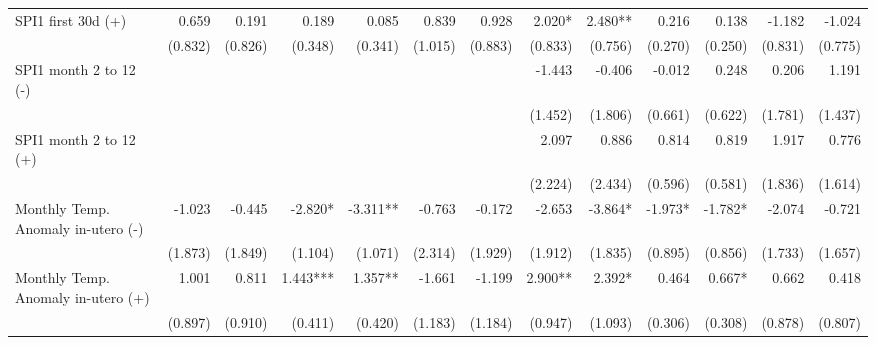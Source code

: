 \begin{table}[H]
\begin{adjustbox}{max width=\linewidth}
\begin{tabular}{lrrrrrrrrrrrr}
    SPI1 first 30d  (+)                         &       0.659 &       0.191 &        0.189 &       0.085  &       0.839 &       0.928  &   2.020* &      2.480**  &        0.216 &        0.138 &       -1.182 &       -1.024\\ 
                                                &     (0.832) &     (0.826) &      (0.348) &     (0.341)  &     (1.015) &     (0.883)  &  (0.833) &      (0.756)  &      (0.270) &      (0.250) &      (0.831) &      (0.775)\\ 
    SPI1 month 2 to 12  (-)                     &             &             &              &              &             &              &   -1.443 &       -0.406  &       -0.012 &        0.248 &        0.206 &        1.191\\ 
                                                &             &             &              &              &             &              &  (1.452) &      (1.806)  &      (0.661) &      (0.622) &      (1.781) &      (1.437)\\ 
    SPI1 month 2 to 12  (+)                     &             &             &              &              &             &              &    2.097 &        0.886  &        0.814 &        0.819 &        1.917 &        0.776\\ 
                                                &             &             &              &              &             &              &  (2.224) &      (2.434)  &      (0.596) &      (0.581) &      (1.836) &      (1.614)\\ 
    Monthly Temp. Anomaly in-utero   (-)        &      -1.023 &      -0.445 &      -2.820* &    -3.311**  &      -0.763 &      -0.172  &   -2.653 &      -3.864*  &      -1.973* &      -1.782* &       -2.074 &       -0.721\\ 
                                                &     (1.873) &     (1.849) &      (1.104) &     (1.071)  &     (2.314) &     (1.929)  &  (1.912) &      (1.835)  &      (0.895) &      (0.856) &      (1.733) &      (1.657)\\ 
    Monthly Temp. Anomaly in-utero  (+)         &       1.001 &       0.811 &     1.443*** &     1.357**  &      -1.661 &      -1.199  &  2.900** &       2.392*  &        0.464 &       0.667* &        0.662 &        0.418\\ 
                                                &     (0.897) &     (0.910) &      (0.411) &     (0.420)  &     (1.183) &     (1.184)  &  (0.947) &      (1.093)  &      (0.306) &      (0.308) &      (0.878) &      (0.807)\\ 

\end{tabular}
\end{adjustbox}
\end{table}
